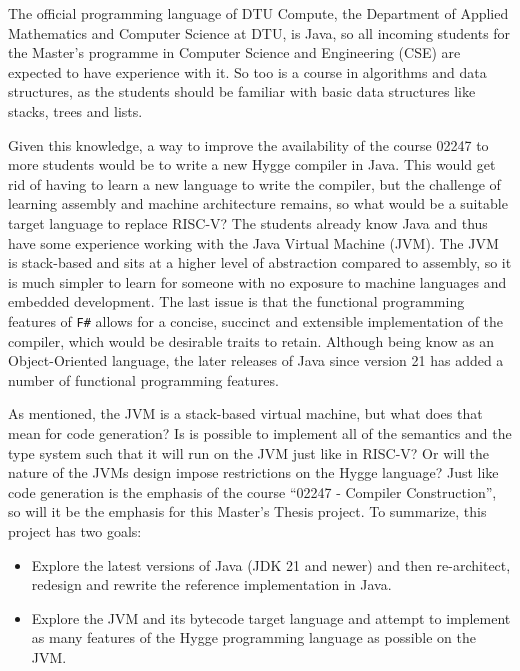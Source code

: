 The official programming language of DTU Compute, the Department of Applied Mathematics and Computer Science at DTU, is Java, so
all incoming students for the Master's programme in Computer Science and Engineering (CSE) are expected to have experience with it.
So too is a course in algorithms and data structures, as the students should be familiar with basic data structures like stacks, trees and lists.

Given this knowledge, a way to improve the availability of the course 02247 to more students would be to write a new Hygge compiler in Java. 
This would get rid of having to learn a new language to write the compiler, but the challenge of learning assembly and machine architecture remains,
so what would be a suitable target language to replace RISC-V? The students already know Java and thus have some experience working with 
the Java Virtual Machine (JVM). The JVM is stack-based and sits at a higher level of abstraction compared to assembly, so it is much simpler 
to learn for someone with no exposure to machine languages and embedded development. The last issue is that the functional programming features
of \texttt{F\#} allows for a concise, succinct and extensible implementation of the compiler, which would be desirable traits to retain. 
Although being know as an Object-Oriented language, the later releases of Java since version 21 has added a number of functional programming features.

As mentioned, the JVM is a stack-based virtual machine, but what does that mean for code generation? Is is possible to implement all of the semantics
and the type system such that it will run on the JVM just like in RISC-V? Or will the nature of the JVMs design impose restrictions on the Hygge language?
Just like code generation is the emphasis of the course ``02247 - Compiler Construction'', so will it be the emphasis for this Master's Thesis project.
To summarize, this project has two goals:

\begin{itemize}
    \item Explore the latest versions of Java (JDK 21 and newer) and then re-architect, redesign and rewrite the reference implementation in Java.
    \item Explore the JVM and its bytecode target language and attempt to implement as many features of the Hygge programming language as possible on the JVM.
\end{itemize}
